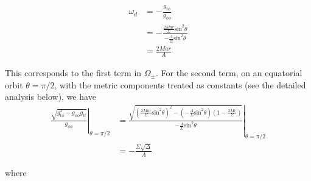 \documentclass[english]{article}
\begin{document}
\begin{align*}
\omega_{d} & =-\frac{g_{t\phi}}{g_{\phi\phi}}\\
 & =-\frac{\frac{2Mar}{\Sigma}\text{sin}^{2}\theta}{-\frac{A}{\Sigma}\text{sin}^{2}\theta}\\
 & =\frac{2Mar}{A}
\end{align*}
 

This corresponds to the first term in $\Omega_{\pm}$. For the second
term, on an equatorial orbit $\theta=\pi/2$, with the metric components
treated as constants (see the detailed analysis below), we have 
\begin{align*}
\left.\frac{\sqrt{g^{2}_{t\phi}-g_{\phi\phi}g_{tt}}}{g_{\phi\phi}}\right|_{\theta=\pi/2} & =\left.\frac{\sqrt{\left(\frac{2Mar}{\Sigma}\text{sin}^{2}\theta\right)^{2}-\left(-\frac{A}{\Sigma}\text{sin}^{2}\theta\right)\left(1-\frac{2Mr}{\Sigma}\right)}}{-\frac{A}{\Sigma}\text{sin}^{2}\theta}\right|_{\theta=\pi/2}\\
 & =-\frac{\Sigma\sqrt{\Delta}}{A}
\end{align*}

where
\end{document}
